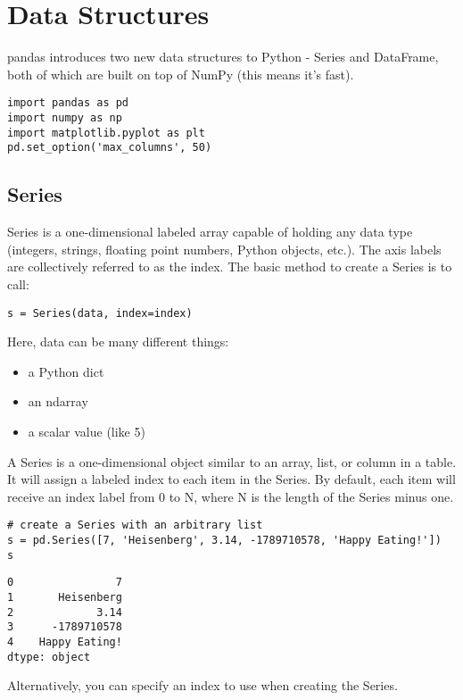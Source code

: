 \documentclass[KSmain.tex]{subfiles}
\begin{document}
 

\section{Data Structures}

pandas introduces two new data structures to Python - Series and DataFrame, both of which are built on top of NumPy (this means it's fast).

\begin{framed}
\begin{verbatim}
import pandas as pd
import numpy as np
import matplotlib.pyplot as plt
pd.set_option('max_columns', 50)
\end{verbatim}
\end{framed}
\subsection{Series}

Series is a one-dimensional labeled array capable of holding any data type (integers, strings, floating point numbers, Python objects, etc.). The axis labels are collectively referred to as the index. The basic method to create a Series is to call:
 
\begin{framed}
\begin{verbatim}
s = Series(data, index=index)
\end{verbatim}
\end{framed} 
Here, data can be many different things:
 
\begin{itemize}
\item a Python dict
\item an ndarray
\item a scalar value (like 5)
\end{itemize}

A Series is a one-dimensional object similar to an array, list, or column in a table. It will assign a labeled index to each item in the Series. By default, each item will receive an index label from 0 to N, where N is the length of the Series minus one.

\begin{framed}
\begin{verbatim}
# create a Series with an arbitrary list
s = pd.Series([7, 'Heisenberg', 3.14, -1789710578, 'Happy Eating!'])
s
\end{verbatim}
\end{framed}
\begin{verbatim}
0                7
1       Heisenberg
2             3.14
3      -1789710578
4    Happy Eating!
dtype: object
\end{verbatim}
Alternatively, you can specify an index to use when creating the Series.
\end{document}
